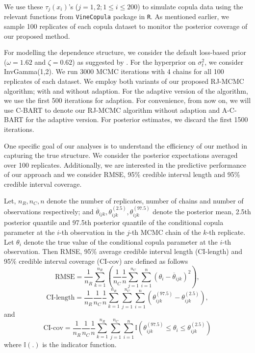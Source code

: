\documentclass[
12pt]{article}
\begin{document}
	We use these $\tau_j(x_i)$'s ($j=1,2; 1\le i\le 200$) to simulate copula data using the relevant functions from \texttt{VineCopula} package in \texttt{R}. As mentioned earlier, we sample 100 replicates of each copula dataset to monitor the posterior coverage of our proposed method.
	
	For modelling the dependence structure, we consider the default loss-based prior ($\omega = 1.62$ and $\zeta = 0.62$) as suggested by \citet{serafini2024lossbasedpriortreetopologies}. For the hyperprior on $\sigma_t^2$, we consider InvGamma(1,2). We run 3000 MCMC iterations with 4 chains for all 100 replicates of each dataset. We employ both variants of our proposed RJ-MCMC algorithm; with and without adaption. For the adaptive version of the algorithm, we use the first 500 iterations for adaption. For convenience, from now on, we will use C-BART to denote our RJ-MCMC algorithm without adaption and A-C-BART for the adaptive version. For posterior estimates, we discard the first 1500 iterations.
	
	One specific goal of our analyses is to understand the efficiency of our method in capturing the true structure. We consider the posterior expectations averaged over 100 replicates. Additionally, we are interested in the predictive performance of our approach and we consider RMSE, 95\% credible interval length and 95\% credible interval coverage. 
	
	Let, $n_R, n_C, n$ denote the number of replicates, number of chains and number of observations respectively; and $\overline{\theta}_{ijk}, {\theta}^{(2.5)}_{ijk}, {\theta}^{(97.5)}_{ijk}$ denote the posterior mean, 2.5th posterior quantile and 97.5th posterior quantile of the conditional copula parameter at the $i$-th observation in the $j$-th MCMC chain of the $k$-th replicate. Let $\theta_i$ denote the true value of the conditional copula parameter at the $i$-th observation. Then RMSE, 95\% average credible interval length (CI-length) and 95\% credible interval coverage (CI-cov) are defined as follows
	\begin{equation*}
		\text{RMSE} = \frac{1}{n_R}\sum_{k=1}^{n_R}\left(\frac{1}{n_C}\frac{1}{n}\sum_{j=1}^{n_C}\sum_{i=1}^{n}\left(\theta_i - \overline{\theta}_{ijk}\right)^2\right),
	\end{equation*}
	\begin{equation*}
		\text{CI-length} = \frac{1}{n_R}\frac{1}{n_C}\frac{1}{n}\sum_{k=1}^{n_R}\sum_{j=1}^{n_C}\sum_{i=1}^{n}\left({\theta}^{(97.5)}_{ijk}-{\theta}^{(2.5)}_{ijk}\right),
	\end{equation*}
	and
	\begin{equation*}
		\text{CI-cov} = \frac{1}{n_R}\frac{1}{n_C}\frac{1}{n}\sum_{k=1}^{n_R}\sum_{j=1}^{n_C}\sum_{i=1}^{n}\mathbb{I}\left({\theta}^{(97.5)}_{ijk}\le\theta_i\le {\theta}^{(2.5)}_{ijk}\right)
	\end{equation*}
	where $\mathbb{I}(.)$ is the indicator function.
	
\end{document}
